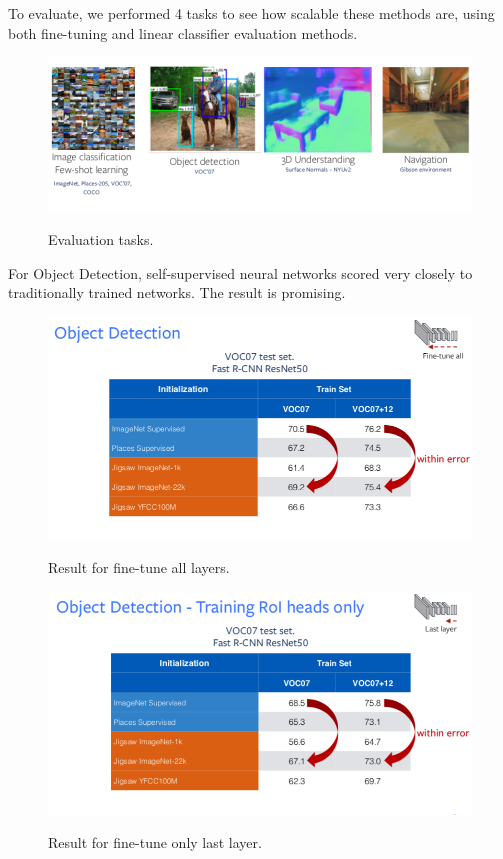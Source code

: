 To evaluate, we performed 4 tasks to see how scalable these methods are, using both fine-tuning and linear classifier evaluation methods.

\begin{figure}[H]
\centering
\includegraphics[width=0.8\linewidth]{figs/evaluation.png}
\label{fig:evaluation}
\caption{Evaluation tasks.}
\end{figure}

For Object Detection, self-supervised neural networks scored very closely to traditionally trained networks. The result is promising.


\begin{figure}[H]
\centering
\includegraphics[width=0.8\linewidth]{figs/od.png}
\label{fig:od}
\caption{Result for fine-tune all layers.}
\end{figure}

\begin{figure}[H]
\centering
\includegraphics[width=0.8\linewidth]{figs/od1.png}
\label{fig:od1}
\caption{Result for fine-tune only last layer.}
\end{figure}

